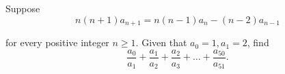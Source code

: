 Suppose\[ n(n+1)a_{n+1}=n(n-1)a_n-(n-2)a_{n-1}

\]

for every positive integer $ n\ge1$. Given that $ a_0=1,a_1=2$,  find\[ \frac{a_0}{a_1}+\frac{a_1}{a_2}+\frac{a_2}{a_3}+\dots+\frac{a_{50}}{a_{51}}.

\]